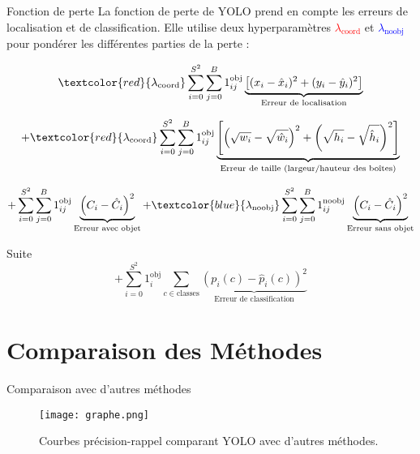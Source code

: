 \documentclass{beamer}
\begin{document}
\begin{frame}{Fonction de perte}
    La fonction de perte de YOLO prend en compte les erreurs de localisation et de classification. 
    Elle utilise deux hyperparamètres \textcolor{red}{$\lambda_{\text{coord}}$} et \textcolor{blue}{$\lambda_{\text{noobj}}$} pour pondérer les différentes parties de la perte :\pause

    \begin{equation}
    \textcolor{red}{\lambda_{\text{coord}}} \sum_{i=0}^{S^2} \sum_{j=0}^{B} 1^{\text{obj}}_{ij} 
    \underbrace{\left[(x_i - \hat{x}_i)^2 + (y_i - \hat{y}_i)^2\right]}_{\text{Erreur de localisation}}
    \end{equation}\pause

    \begin{equation}
    + \textcolor{red}{\lambda_{\text{coord}}} \sum_{i=0}^{S^2} \sum_{j=0}^{B} 1^{\text{obj}}_{ij}
    \underbrace{\left[\left(\sqrt{w_i} - \sqrt{\hat{w}_i}\right)^2 + \left(\sqrt{h_i} - \sqrt{\hat{h}_i}\right)^2 \right]}_{\text{Erreur de taille (largeur/hauteur des boîtes)}}
    \end{equation}\pause

    \begin{equation}
    + \sum_{i=0}^{S^2} \sum_{j=0}^{B} 1^{\text{obj}}_{ij}
    \underbrace{\left(C_i - \hat{C}_i\right)^2}_{\text{Erreur avec objet}}
    + \textcolor{blue}{\lambda_{\text{noobj}}} \sum_{i=0}^{S^2} \sum_{j=0}^{B} 1^{\text{noobj}}_{ij}
    \underbrace{\left(C_i - \hat{C}_i\right)^2}_{\text{Erreur sans objet}}
    \end{equation}\pause
\end{frame}
\begin{frame}{Suite}
    \begin{equation}
    + \sum_{i=0}^{S^2} 1^{\text{obj}}_i \sum_{c \in \text{classes}} 
    \underbrace{\left(p_i(c) - \hat{p}_i(c)\right)^2}_{\text{Erreur de classification}}
    \end{equation}
\end{frame}


\section{Comparaison des Méthodes}
\begin{frame}{Comparaison avec d'autres méthodes}
    \begin{figure}
        \centering
        \texttt{[image: graphe.png]}
        \caption{Courbes précision-rappel comparant YOLO avec d'autres méthodes.}
    \end{figure}
\end{frame}
\end{document}
